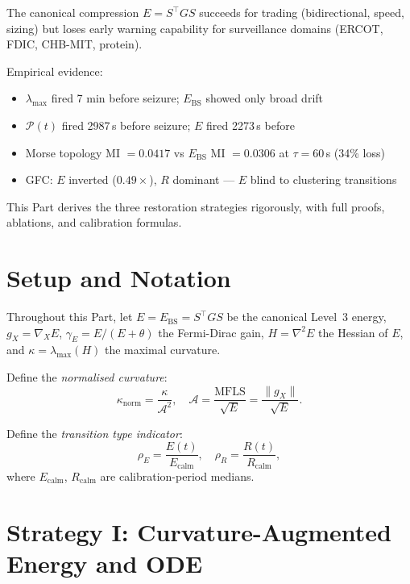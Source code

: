 \documentclass[11pt,a4paper]{article}
\theoremstyle{definition}
\begin{document}
\noindent
The canonical compression $E = S^\top GS$ succeeds for trading
(bidirectional, speed, sizing) but loses early warning capability
for surveillance domains (ERCOT, FDIC, CHB-MIT, protein).

Empirical evidence:
\begin{itemize}
\item $\lambda_\mathrm{max}$ fired 7 min before seizure; $E_\mathrm{BS}$ showed only broad drift
\item $\mathcal{P}(t)$ fired 2987\,s before seizure; $E$ fired 2273\,s before
\item Morse topology MI $= 0.0417$ vs $E_\mathrm{BS}$ MI $= 0.0306$ at $\tau=60$\,s (34\% loss)
\item GFC: $E$ inverted ($0.49\times$), $R$ dominant --- $E$ blind to clustering transitions
\end{itemize}

This Part derives the three restoration strategies rigorously,
with full proofs, ablations, and calibration formulas.

\section{Setup and Notation}
\label{sec:ew_setup}

\noindent
Throughout this Part, let $E = E_\mathrm{BS} = S^\top GS$ be the canonical
Level~3 energy, $g_X = \nabla_X E$, $\gamma_E = E/(E+\theta)$ the
Fermi-Dirac gain, $H = \nabla^2 E$ the Hessian of $E$,
and $\kappa = \lambda_\mathrm{max}(H)$ the maximal curvature.

Define the \emph{normalised curvature}:
\[
\kappa_\mathrm{norm} = \frac{\kappa}{\mathcal{A}^2}, \quad
\mathcal{A} = \frac{\mathrm{MFLS}}{\sqrt{E}} = \frac{\|g_X\|}{\sqrt{E}}.
\]

Define the \emph{transition type indicator}:
\[
\rho_E = \frac{E(t)}{E_\mathrm{calm}}, \quad
\rho_R = \frac{R(t)}{R_\mathrm{calm}},
\]
where $E_\mathrm{calm}$, $R_\mathrm{calm}$ are calibration-period medians.

\section{Strategy I: Curvature-Augmented Energy and ODE}
\label{sec:curvature_ode}
\end{document}
